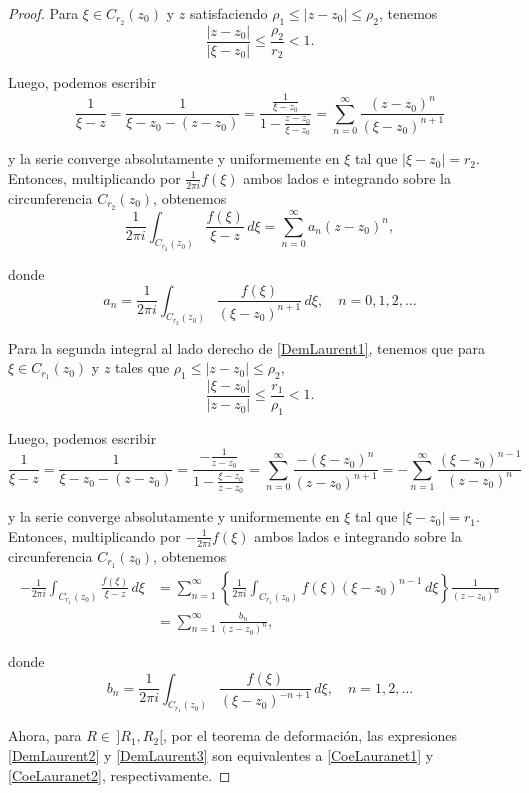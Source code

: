 \begin{proof}
Para $\xi \in C_{r_2}(z_0)$ y $z$ satisfaciendo $\rho_1 \leq |z-z_0| \leq \rho_2$, tenemos 
$$\frac{|z-z_0|}{|\xi-z_0|} \leq \frac{\rho_2}{r_2} < 1.$$

Luego, podemos escribir
$$\frac{1}{\xi-z} = \frac{1}{\xi - z_0 - (z-z_0)} = \frac{\frac{1}{\xi-z_0}}{1 - \frac{z-z_0}{\xi-z_0}} = \sum_{n=0}^{\infty} \frac{(z-z_0)^n}{(\xi-z_0)^{n+1}}$$

y la serie converge absolutamente y uniformemente en $\xi$ tal que $|\xi-z_0| = r_2$. Entonces, multiplicando por $\frac{1}{2\pi i} f(\xi)$ ambos lados e integrando sobre la circunferencia $C_{r_2}(z_0)$, obtenemos
$$\frac{1}{2\pi i} \int_{C_{r_2}(z_0)} \frac{f(\xi)}{\xi - z} \,d\xi = \sum_{n=0}^{\infty} a_n (z-z_0)^n,$$

donde
\begin{equation}
a_n = \frac{1}{2\pi i} \int_{C_{r_2}(z_0)} \frac{f(\xi)}{(\xi-z_0)^{n+1}} \,d\xi, \quad n = 0,1,2, \dots    \label{DemLaurent2}
\end{equation}

Para la segunda integral al lado derecho de \eqref{DemLaurent1}, tenemos que para $ \xi \in C_{r_1}(z_0)$ y $z$ tales que $\rho_1 \leq |z-z_0| \leq \rho_2$,
$$\frac{|\xi-z_0|}{|z-z_0|} \leq \frac{r_1}{\rho_1} < 1.$$

Luego, podemos escribir
$$\frac{1}{\xi-z} = \frac{1}{\xi - z_0 - (z-z_0)} = \frac{-\frac{1}{z-z_0}}{1 - \frac{\xi-z_0}{z-z_0}} = \sum_{n=0}^{\infty} \frac{-(\xi-z_0)^n}{(z-z_0)^{n+1}} = - \sum_{n=1}^{\infty} \frac{(\xi-z_0)^{n-1}}{(z-z_0)^n}$$

y la serie converge absolutamente y uniformemente en $\xi$ tal que $|\xi-z_0| = r_1$. Entonces, multiplicando por $-\frac{1}{2\pi i} f(\xi)$ ambos lados e integrando sobre la circunferencia $C_{r_1}(z_0)$, obtenemos
\begin{align*}
 -\frac{1}{2\pi i} \int_{C_{r_1}(z_0)} \frac{f(\xi)}{\xi - z} \,d\xi &= \sum_{n=1}^{\infty} \left\{ \frac{1}{2\pi i} \int_{C_{r_1}(z_0)} f(\xi) (\xi - z_0)^{n-1} \,d\xi\right\} \frac{1}{(z-z_0)^n} \\
 &= \sum_{n=1}^{\infty} \frac{b_n}{(z-z_0)^n},
\end{align*}

donde 
\begin{equation}
b_n =  \frac{1}{2\pi i} \int_{C_{r_1}(z_0)} \frac{f(\xi)}{(\xi - z_0)^{-n+1}} \,d\xi, \quad n = 1,2, \dots   \label{DemLaurent3}
\end{equation}

Ahora, para $R \in \,]R_1, R_2[$, por el teorema de deformación, las expresiones \eqref{DemLaurent2} y \eqref{DemLaurent3} son equivalentes a \eqref{CoeLauranet1} y \eqref{CoeLauranet2}, respectivamente.


\end{proof}

